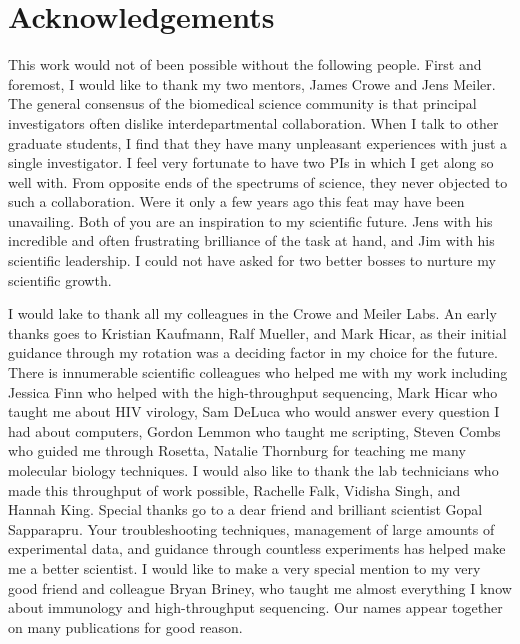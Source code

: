 \chapter*{Acknowledgements}
\vspace{7mm}
This work would not of been possible without the following people.
First and foremost, I would like to thank my two mentors, James Crowe and Jens Meiler. The general consensus of the biomedical science community is that principal investigators often dislike interdepartmental collaboration. When I talk to other graduate students, I find that they have many unpleasant experiences with just a single investigator. I feel very fortunate to have two PIs in which I get along so well with. From opposite ends of the spectrums of science, they never objected to such a collaboration. Were it only a few years ago this feat may have been unavailing. Both of you are an inspiration to my scientific future. Jens with his incredible and often frustrating brilliance of the task at hand, and Jim with his scientific leadership. I could not have asked for two better bosses to nurture my scientific growth.

I would lake to thank all my colleagues in the Crowe and Meiler Labs. An early thanks goes to Kristian Kaufmann, Ralf Mueller, and Mark Hicar, as their initial guidance through my rotation was a deciding factor in my choice for the future. There is innumerable scientific colleagues who helped me with my work including Jessica Finn who helped with the high-throughput sequencing, Mark Hicar who taught me about HIV virology, Sam DeLuca who would answer every question I had about computers, Gordon Lemmon who taught me scripting, Steven Combs who guided me through Rosetta, Natalie Thornburg for teaching me many molecular biology techniques. I would also like to thank the lab technicians who made this throughput of work possible, Rachelle Falk, Vidisha Singh, and Hannah King. Special thanks go to a dear friend and brilliant scientist Gopal Sapparapru. Your troubleshooting techniques, management of large amounts of experimental data, and guidance through countless experiments has helped make me a better scientist. I would like to make a very special mention to my very good friend and colleague Bryan Briney, who taught me almost everything I know about immunology and high-throughput sequencing. Our names appear together on many publications for good reason.

